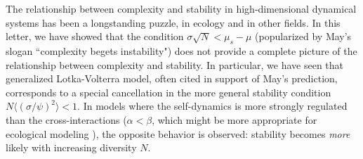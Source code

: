 
The relationship between complexity and stability in high-dimensional dynamical systems has been a longstanding puzzle, in ecology and in other fields. 
In this letter, we have showed that the condition $\sigma\sqrt{N}< \mu_s - \mu$ (popularized by May's slogan ``complexity begets instability") does not provide a complete picture of the relationship between complexity and stability. 
In particular, we have seen that generalized Lotka-Volterra model, often cited in support of May's prediction, corresponds to a special cancellation in the more general stability condition $N\langle (\sigma/\psi)^2\rangle < 1$.
In models where the self-dynamics is more strongly regulated than the cross-interactions ($\alpha < \beta$, which might be more appropriate for ecological modeling \cite{Hatton2023}), the opposite behavior is observed: stability becomes \emph{more} likely with increasing diversity $N$.  